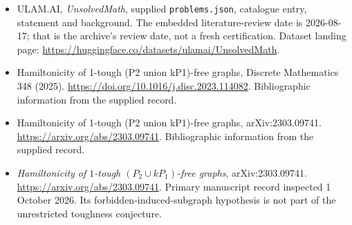 \documentclass[11pt,a4paper]{article}
\begin{document}
{\small

\begin{itemize}

\item[\hypertarget{source:statement:1}{S1}] ULAM.AI, \emph{UnsolvedMath}, supplied \texttt{problems.json}, catalogue entry, statement and background. The embedded literature-review date is 2026-08-17; that is the archive’s review date, not a fresh certification. Dataset landing page: \url{https://huggingface.co/datasets/ulamai/UnsolvedMath}.

\item[\hypertarget{source:statement:2}{S2}] Hamiltonicity of 1-tough (P2 union kP1)-free graphs, Discrete Mathematics 348 (2025). \url{https://doi.org/10.1016/j.disc.2023.114082}. Bibliographic information from the supplied record.

\item[\hypertarget{source:statement:3}{S3}] Hamiltonicity of 1-tough (P2 union kP1)-free graphs, arXiv:2303.09741. \url{https://arxiv.org/abs/2303.09741}. Bibliographic information from the supplied record.


\item[E1] \emph{Hamiltonicity of $1$-tough
$(P_2\cup kP_1)$-free graphs}, arXiv:2303.09741.
\url{https://arxiv.org/abs/2303.09741}. Primary manuscript record
inspected 1 October 2026. Its forbidden-induced-subgraph hypothesis
is not part of the unrestricted toughness conjecture.

\end{itemize}

}

\label{end:statement}
\end{document}
